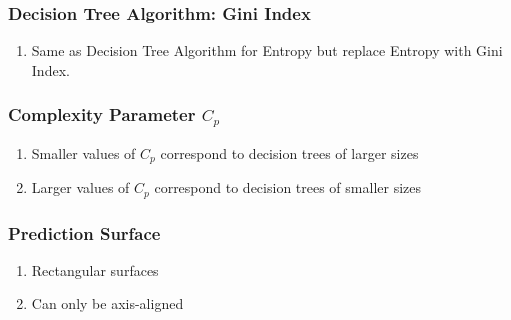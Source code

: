 \documentclass[../../dsa1101_notes.Rtex]{subfiles}\usepackage[]{graphicx}\usepackage[]{color}
\begin{document}
\subsubsection{Decision Tree Algorithm: Gini Index}
\begin{enumerate}
    \item Same as Decision Tree Algorithm for Entropy but replace Entropy with Gini Index.
\end{enumerate}

\subsubsection{Complexity Parameter $C_p$}
\begin{enumerate}
  \item Smaller values of \(C_p\) correspond to decision trees of larger sizes
  \item Larger values of \(C_p\) correspond to decision trees of smaller sizes
\end{enumerate}

\subsubsection{Prediction Surface}
\begin{enumerate}
    \item Rectangular surfaces
    \item Can only be axis-aligned
\end{enumerate}
\end{document}
